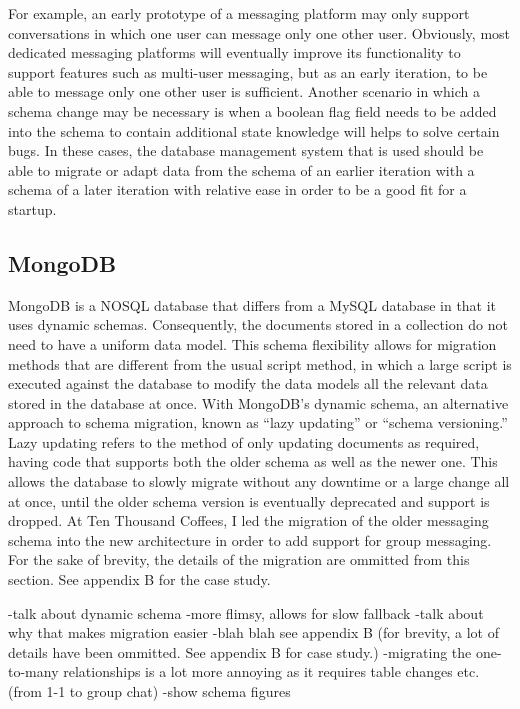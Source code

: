 \documentclass[12pt]{article}
\begin{document}
For example, an early prototype of a messaging platform may only support conversations in which one user can message only one other user. Obviously, most dedicated messaging platforms will eventually improve its functionality to support features such as multi-user messaging, but as an early iteration, to be able to message only one other user is sufficient. Another scenario in which a schema change may be necessary is when a boolean flag field needs to be added into the schema to contain additional state knowledge will helps to solve certain bugs. In these cases, the database management system that is used should be able to migrate or adapt data from the schema of an earlier iteration with a schema of a later iteration with relative ease in order to be a good fit for a startup.

\subsection{MongoDB}
MongoDB is a NOSQL database that differs from a MySQL database in that it uses dynamic schemas. Consequently, the documents stored in a collection do not need to have a uniform data model. This schema flexibility allows for migration methods that are different from the usual script method, in which a large script is executed against the database to modify the data models all the relevant data stored in the database at once. With MongoDB's dynamic schema, an alternative approach to schema migration, known as ``lazy updating'' or ``schema versioning.'' Lazy updating refers to the method of only updating documents as required, having code that supports both the older schema as well as the newer one. This allows the database to slowly migrate without any downtime or a large change all at once, until the older schema version is eventually deprecated and support is dropped. At Ten Thousand Coffees, I led the migration of the older messaging schema into the new architecture in order to add support for group messaging. For the sake of brevity, the details of the migration are ommitted from this section. See appendix B for the case study.

-talk about dynamic schema
-more flimsy, allows for slow fallback
-talk about why that makes migration easier
-blah blah see appendix B (for brevity, a lot of details have been ommitted. See appendix B for case study.) -migrating the one-to-many relationships is a lot more annoying as it requires table changes etc. (from 1-1 to group chat)
-show schema figures
\end{document}
